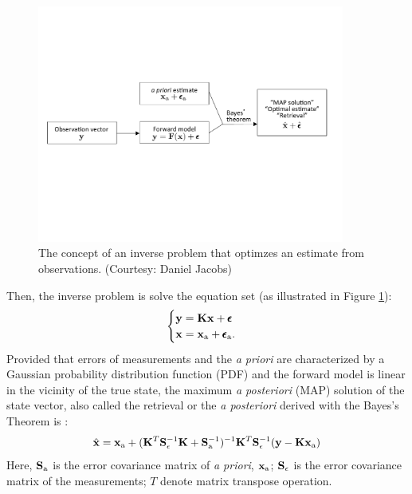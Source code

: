 \begin{figure}[t]
  \centering
  \includegraphics[width={0.9\textwidth}]{figures/MAP.pdf}
  \caption[The concept of an inverse problem that optimzes an estimate
from observations.]{The concept of an inverse problem that optimzes an 
estimate from observations. (Courtesy: Daniel Jacobs)}
  \label{fig:map}
\end{figure}

Then, the inverse problem is solve the equation set (as
illustrated in Figure \ref{fig:map}):
\begin{equation}
\begin{cases}
\mathbf{y} = \mathbf{K}\mathbf{x} + \pmb{\epsilon} \\
\mathbf{x} = \mathbf{x}_\text{a} + \pmb{\epsilon}_\text{a}.
\end{cases}
\label{eq:inverse2}
\end{equation}
Provided that errors of measurements and the \textit{a priori} are characterized
by a Gaussian probability distribution function (PDF) and the forward
model is linear in the vicinity of the true state, the maximum
\textit{a posteriori} (MAP) solution of the state vector, also called the 
retrieval or the \textit{a posteriori} derived with the Bayes's Theorem
is \citep{Rodgers00}:
\begin{equation}
\hat{\mathbf{x}} = \mathbf{x}_\text{a} + (\mathbf{K}^T\mathbf{S}_\epsilon^{-1}\mathbf{K}+\mathbf{S}_\text{a}^{-1})^{-1}
\mathbf{K}^T\mathbf{S}_\epsilon^{-1}(\mathbf{y}-\mathbf{K}\mathbf{x}_\text{a}) \label{eq:xhat}
\end{equation}
Here, $\mathbf{S}_\text{a}$ is the error covariance matrix of \textit{a priori},
$\mathbf{x}_\text{a}$; $\mathbf{S}_\epsilon$ is the error covariance matrix of the
measurements; $T$ denote matrix transpose operation. 

